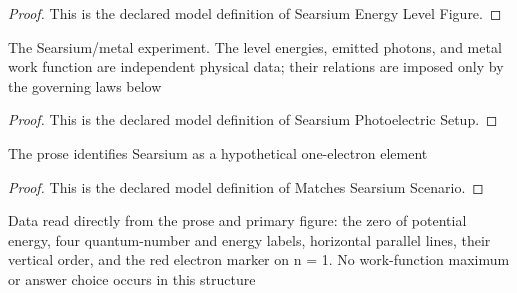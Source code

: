 \begin{proof}
  This is the declared model definition of Searsium Energy Level Figure.
\end{proof}
\begin{definition}
  \label{def:physics:phyx-mini-0518:phyxminiproblems-problemphyxmini0518-searsiumphotoelectricsetup}
  The Searsium/metal experiment. The level energies, emitted photons, and metal work function are independent physical data; their relations are imposed only by the governing laws below
\end{definition}
\begin{proof}
  This is the declared model definition of Searsium Photoelectric Setup.
\end{proof}
\begin{definition}
  \label{def:physics:phyx-mini-0518:phyxminiproblems-problemphyxmini0518-matchessearsiumscenario}
  The prose identifies Searsium as a hypothetical one-electron element
\end{definition}
\begin{proof}
  This is the declared model definition of Matches Searsium Scenario.
\end{proof}
\begin{definition}
  \label{def:physics:phyx-mini-0518:phyxminiproblems-problemphyxmini0518-matchesproblemandfigurereadouts}
  Data read directly from the prose and primary figure: the zero of potential energy, four quantum-number and energy labels, horizontal parallel lines, their vertical order, and the red electron marker on n = 1. No work-function maximum or answer choice occurs in this structure
\end{definition}
